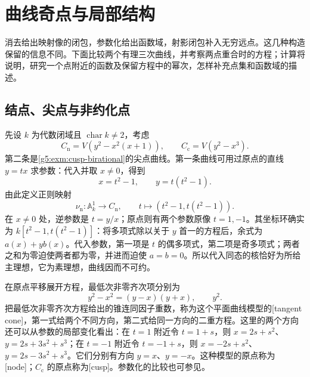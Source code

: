 
% 
% 
% 

\section{曲线奇点与局部结构}
\label{g5:sec:0105}

消去给出映射像的闭包，参数化给出函数域，射影闭包补入无穷远点。这几种构造保留的信息不同。下面比较两个有理三次曲线，并考察两点重合时的方程；计算将说明，研究一个点附近的函数及保留方程中的幂次，怎样补充点集和函数域的描述。

\subsection{结点、尖点与非约化点}
\label{g5:subsec:0105:01}

先设 \(k\) 为代数闭域且 \(\operatorname{char}k\ne2\)，考虑
\[
	C_{\mathrm n}=V(y^2-x^2(x+1)),\qquad
	C_{\mathrm c}=V(y^2-x^3).
\]
第二条是\cref{g5:exm:cusp-birational}的尖点曲线。第一条曲线可用过原点的直线 \(y=tx\) 求参数：代入并取 \(x\ne0\)，得到
\[
	x=t^2-1,\qquad y=t(t^2-1).
\]
由此定义正则映射
\[
	\nu_{\mathrm n}:\mathbb A_k^1\longrightarrow C_{\mathrm n},
	\qquad t\longmapsto(t^2-1,t(t^2-1)).
\]
在 \(x\ne0\) 处，逆参数是 \(t=y/x\)；原点则有两个参数原像 \(t=1,-1\)。其坐标环确实为 \(k[t^2-1,t(t^2-1)]\)：将多项式除以关于 \(y\) 首一的方程后，余式为 \(a(x)+yb(x)\)。代入参数，第一项是 \(t\) 的偶多项式，第二项是奇多项式；两者之和为零迫使两者都为零，并进而迫使 \(a=b=0\)。所以代入同态的核恰好为所给主理想，它为素理想，曲线因而不可约。

\ProseParagraphBreak

在原点平移展开方程，最低次非零齐次项分别为
\[
	y^2-x^2=(y-x)(y+x),\qquad y^2.
\]
把最低次非零齐次方程给出的锥连同因子重数，称为这个平面曲线模型的[tangent cone]，第一式给两个不同方向，第二式给同一方向的二重方程。这里的两个方向还可以从参数的局部变化看出：在 \(t=1\) 附近令 \(t=1+s\)，则 \(x=2s+s^2\)、\(y=2s+3s^2+s^3\)；在 \(t=-1\) 附近令 \(t=-1+s\)，则 \(x=-2s+s^2\)、\(y=2s-3s^2+s^3\)。它们分别有方向 \(y=x\)、\(y=-x\)。这种模型的原点称为[node]；\(C_{\mathrm c}\) 的原点称为[cusp]。参数化的比较也可参见\cite[第I章第4节，例4.9.1及习题4.10]{Hartshorne1977}。

